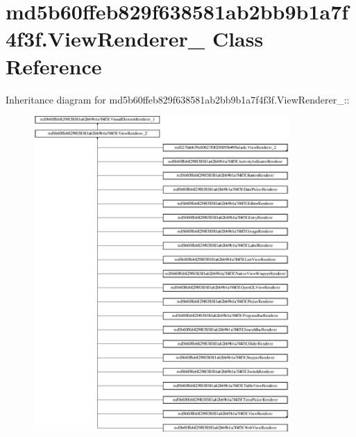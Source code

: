 \hypertarget{classmd5b60ffeb829f638581ab2bb9b1a7f4f3f_1_1_view_renderer__2}{
\section{md5b60ffeb829f638581ab2bb9b1a7f4f3f.ViewRenderer\_ Class Reference}
\label{classmd5b60ffeb829f638581ab2bb9b1a7f4f3f_1_1_view_renderer__2}
}
Inheritance diagram for md5b60ffeb829f638581ab2bb9b1a7f4f3f.ViewRenderer\_::\begin{figure}[H]
\begin{center}
\leavevmode
\includegraphics[height=12cm]{classmd5b60ffeb829f638581ab2bb9b1a7f4f3f_1_1_view_renderer__2}
\end{center}
\end{figure}
